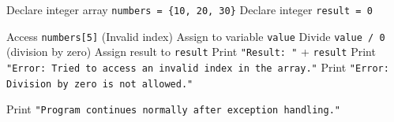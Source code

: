 \begin{algorithm}[H]
\caption{Exception Handling Demonstration}
\begin{algorithmic}[1]
\STATE Declare integer array \texttt{numbers = \{10, 20, 30\}}
\STATE Declare integer \texttt{result = 0}

\TRY
    \STATE Access \texttt{numbers[5]} (Invalid index)
    \STATE Assign to variable \texttt{value}
    \STATE Divide \texttt{value / 0} (division by zero)
    \STATE Assign result to \texttt{result}
    \STATE Print \texttt{"Result: "} + \texttt{result}
    \STATE Print \texttt{"Error: Tried to access an invalid index in the array."}
    \STATE Print \texttt{"Error: Division by zero is not allowed."}
\ENDTRY

\STATE Print \texttt{"Program continues normally after exception handling."}
\end{algorithmic}
\end{algorithm}
